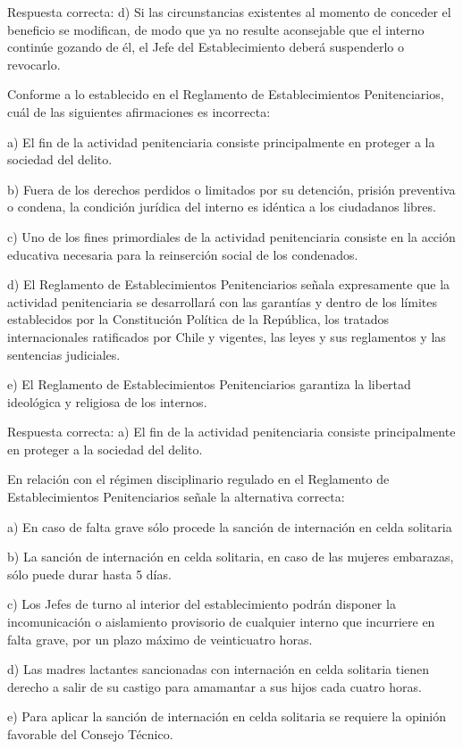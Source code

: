 \documentclass[letterpaper, 11pt]{article}
\begin{document}
Respuesta correcta:
d) Si las circunstancias existentes al momento de conceder el
beneficio se modifican, de modo que ya no resulte aconsejable que el interno
continúe gozando de él, el Jefe del Establecimiento deberá suspenderlo o revocarlo.


Conforme a lo establecido en el Reglamento de Establecimientos Penitenciarios, cuál
de las siguientes afirmaciones es incorrecta:

a) El fin de la actividad penitenciaria consiste principalmente en proteger a la sociedad del
delito.

b) Fuera de los derechos perdidos o limitados por su detención, prisión preventiva o
condena, la condición jurídica del interno es idéntica a los ciudadanos libres.

c) Uno de los fines primordiales de la actividad penitenciaria consiste en la acción educativa
necesaria para la reinserción social de los condenados.

d) El Reglamento de Establecimientos Penitenciarios señala expresamente que la actividad
penitenciaria se desarrollará con las garantías y dentro de los límites establecidos por la
Constitución Política de la República, los tratados internacionales ratificados por Chile y
vigentes, las leyes y sus reglamentos y las sentencias judiciales.

e) El Reglamento de Establecimientos Penitenciarios garantiza la libertad ideológica y
religiosa de los internos.

Respuesta correcta:
a) El fin de la actividad penitenciaria consiste principalmente en
proteger a la sociedad del delito.


En relación con el régimen disciplinario regulado en el Reglamento de Establecimientos
Penitenciarios señale la alternativa correcta:

a) En caso de falta grave sólo procede la sanción de internación en celda solitaria

b) La sanción de internación en celda solitaria, en caso de las mujeres embarazas, sólo
puede durar hasta 5 días.

c) Los Jefes de turno al interior del establecimiento podrán disponer la incomunicación o
aislamiento provisorio de cualquier interno que incurriere en falta grave, por un plazo
máximo de veinticuatro horas.

d) Las madres lactantes sancionadas con internación en celda solitaria tienen derecho a
salir de su castigo para amamantar a sus hijos cada cuatro horas.

e) Para aplicar la sanción de internación en celda solitaria se requiere la opinión favorable
del Consejo Técnico.
\end{document}
